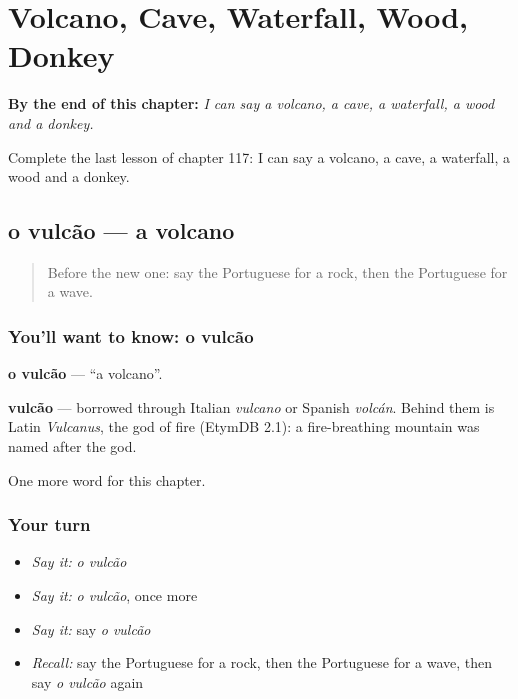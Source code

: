 
\chapter{Volcano, Cave, Waterfall, Wood, Donkey}
\label{ch:pt-volcano-cave-waterfall-wood-donkey}

\begin{chapteropening}
\textbf{By the end of this chapter:} \emph{I can say a volcano, a cave, a waterfall, a wood and a donkey.}

Complete the last lesson of chapter 117: I can say a volcano, a cave, a waterfall, a wood and a donkey.
\end{chapteropening}

\section[o vulcão]{o vulcão — a volcano}

\label{lesson:PT-C117-vulcao}



\begin{quote}
Before the new one: say the Portuguese for a rock, then the Portuguese for a wave.
\end{quote}

\subsection*{You'll want to know: o vulcão}
\textbf{o vulcão} — \textquotedblleft{}a volcano\textquotedblright{}.

\begin{cousinweb}
\textbf{vulcão} — borrowed through Italian \emph{vulcano} or Spanish \emph{volcán}. Behind them is Latin \emph{Vulcanus}, the god of fire (EtymDB 2.1): a fire-breathing mountain was named after the god.
\end{cousinweb}

\begin{grammarlens}[title={What you've built}]
One more word for this chapter.
\end{grammarlens}

\subsection*{Your turn}
\begin{itemize}
\raggedright
  \item \emph{Say it:} \emph{o vulcão}
  \item \emph{Say it:} \emph{o vulcão}, once more
  \item \emph{Say it:} say \emph{o vulcão}
  \item \emph{Recall:} say the Portuguese for a rock, then the Portuguese for a wave, then say \emph{o vulcão} again
\end{itemize}

